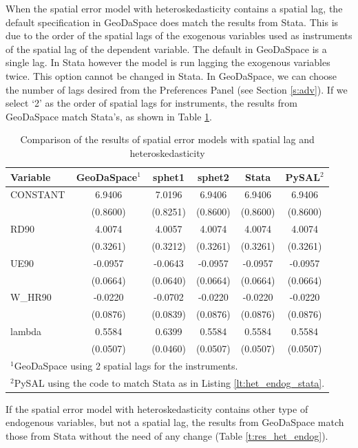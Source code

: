 \documentclass{article}
\begin{document}
When the spatial error model with heteroskedasticity contains a spatial lag, the default specification in GeoDaSpace does match the results from Stata. This is due to the order of the spatial lags of the exogenous variables used as instruments of the spatial lag of the dependent variable. The default in GeoDaSpace is a single lag. In Stata however the model is run lagging the exogenous variables twice. This option cannot be changed in Stata. In GeoDaSpace, we can choose the number of lags desired from the Preferences Panel (see Section \ref{s:adv}). If we select `2' as the order of spatial lags for instruments, the results from GeoDaSpace match Stata's, as shown in Table \ref{t:res_het_combo}. 
\begin{table}[htpb]
\caption{Comparison of the results of spatial error models with spatial lag and heteroskedasticity}
\label{t:res_het_combo}
\centering
\begin{small}
\begin{tabular}{l|ccccc} \hline
\textbf{Variable}&\textbf{GeoDaSpace$^1$}&\textbf{sphet1}&\textbf{sphet2}&\textbf{Stata}&\textbf{PySAL$^2$}\\ \hline
CONSTANT&6.9406&7.0196&6.9406&6.9406&6.9406\\
&(0.8600)&(0.8251)&(0.8600)&(0.8600)&(0.8600)\\
RD90&4.0074&4.0057&4.0074&4.0074&4.0074\\
&(0.3261)&(0.3212)&(0.3261)&(0.3261)&(0.3261)\\
UE90&-0.0957&-0.0643&-0.0957&-0.0957&-0.0957\\
&(0.0664)&(0.0640)&(0.0664)&(0.0664)&(0.0664)\\
W\_HR90&-0.0220&-0.0702&-0.0220&-0.0220&-0.0220\\
&(0.0876)&(0.0839)&(0.0876)&(0.0876)&(0.0876)\\
lambda&0.5584&0.6399&0.5584&0.5584&0.5584\\
&(0.0507)&(0.0460)&(0.0507)&(0.0507)&(0.0507)\\
\hline
\multicolumn{6}{l}{\scriptsize{$^1$GeoDaSpace using 2 spatial lags for the instruments.}} \\
\multicolumn{6}{l}{\scriptsize{$^2$PySAL using the code to match Stata as in Listing \ref{lt:het_endog_stata}.}} \\
\end{tabular}
\end{small}
\end{table}

If the spatial error model with heteroskedasticity contains other type of endogenous variables, but not a spatial lag, the results from GeoDaSpace match those from Stata without the need of any change (Table \ref{t:res_het_endog}).
\end{document}
